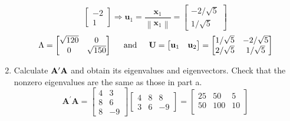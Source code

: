 \begin{enumerate}[label=(\alph*)]
\[\begin{bmatrix}
                    -2 \\
                    1
                \end{bmatrix}
                \Rightarrow
                \mathbf{u}_1
                =
                \frac{\mathbf{x}_1}{\left\|\mathbf{x}_1\right\|}
                =
                \begin{bmatrix}
                    -2/\sqrt{5} \\
                    1/\sqrt{5}
                \end{bmatrix}
            \]
            \[
                \Lambda
                =
                \begin{bmatrix}
                    \sqrt{120} & 0 \\
                    0 & \sqrt{150}
                \end{bmatrix}
                \hspace{0.2in}\text{and}\hspace{0.2in}
                \mathbf{U}
                =
                \begin{bmatrix}
                    \mathbf{u}_1 & \mathbf{u}_2
                \end{bmatrix}
                =
                \begin{bmatrix}
                    1/\sqrt{5} & -2/\sqrt{5} \\
                    2/\sqrt{5} & 1/\sqrt{5}
                \end{bmatrix}
            \]
            \item Calculate $\bold{A}^\prime\bold{A}$ and obtain its eigenvalues and eigenvectors. Check that the nonzero eigenvalues are the same as those in part a.
            \[
                \mathbf{A}^\prime\mathbf{A}
                =
                \begin{bmatrix}
                    4 & 3 \\
                    8 & 6 \\
                    8 & -9
                \end{bmatrix}
                \begin{bmatrix}
                    4 & 8 & 8\\
                    3 & 6 & -9
                \end{bmatrix}
                =
                \begin{bmatrix}
                    25 & 50 & 5 \\
                    50 & 100 & 10 \\

\end{bmatrix}\]
\end{enumerate}
